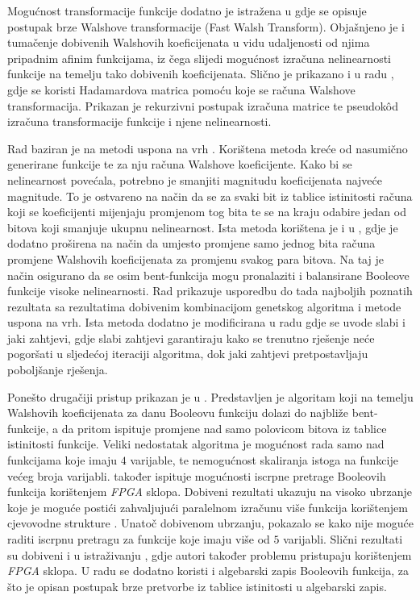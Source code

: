 \documentclass[times, utf8, diplomski, numeric]{fer}
\begin{document}
Mogućnost transformacije funkcije dodatno je istražena u \cite{MeasuringBoolean} gdje se opisuje postupak brze Walshove transformacije \engl(Fast Walsh Transform).
Objašnjeno je i tumačenje dobivenih Walshovih koeficijenata u vidu udaljenosti od njima pripadnim afinim funkcijama, iz čega slijedi mogućnost izračuna nelinearnosti funkcije na temelju tako dobivenih koeficijenata.
Slično je prikazano i u radu \cite{CalculatingNonlinearity}, gdje se koristi Hadamardova matrica pomoću koje se računa Walshove transformacija.
Prikazan je rekurzivni postupak izračuna matrice te pseudok\^{o}d izračuna transformacije funkcije i njene nelinearnosti.

Rad \cite{millan1997smart} baziran je na metodi uspona na vrh .
Korištena metoda kreće od nasumično generirane funkcije te za nju računa Walshove koeficijente.
Kako bi se nelinearnost povećala, potrebno je smanjiti magnitudu koeficijenata najveće magnitude.
To je ostvareno na način da se za svaki bit iz tablice istinitosti računa koji se koeficijenti mijenjaju promjenom tog bita te se na kraju odabire jedan od bitova koji smanjuje ukupnu nelinearnost.
Ista metoda korištena je i u \cite{millan1997effective}, gdje je dodatno proširena na način da umjesto promjene samo jednog bita računa promjene Walshovih koeficijenata za promjenu svakog para bitova.
Na taj je način osigurano da se osim bent-funkcija mogu pronalaziti i balansirane Booleove funkcije visoke nelinearnosti.
Rad \cite{millan1998heuristic} prikazuje usporedbu do tada najboljih poznatih rezultata sa rezultatima dobivenim kombinacijom genetskog algoritma i metode uspona na vrh.
Ista metoda dodatno je modificirana u radu \cite{millan1999boolean} gdje se uvode slabi  i jaki  zahtjevi, gdje slabi zahtjevi garantiraju kako se trenutno rješenje neće pogoršati u sljedećoj iteraciji algoritma, dok jaki zahtjevi pretpostavljaju poboljšanje rješenja.

Ponešto drugačiji pristup prikazan je u \cite{DiscoveryOfBent}.
Predstavljen je algoritam koji na temelju Walshovih koeficijenata za danu Booleovu funkciju dolazi do najbliže bent-funkcije, a da pritom ispituje promjene nad samo polovicom bitova iz tablice istinitosti funkcije.
Veliki nedostatak algoritma je mogućnost rada samo nad funkcijama koje imaju $4$ varijable, te nemogućnost skaliranja istoga na funkcije većeg broja varijabli.
\cite{DiscoveryOfBent} također ispituje mogućnosti iscrpne pretrage Booleovih funkcija korištenjem \textit{FPGA} sklopa.
Dobiveni rezultati ukazuju na visoko ubrzanje koje je moguće postići zahvaljujući paralelnom izračunu više funkcija korištenjem cjevovodne strukture .
Unatoč dobivenom ubrzanju, pokazalo se kako nije moguće raditi iscrpnu pretragu za funkcije koje imaju više od $5$ varijabli.
Slični rezultati su dobiveni i u istraživanju \cite{EnumerationOfBentBoolean}, gdje autori također problemu pristupaju korištenjem \textit{FPGA} sklopa.
U radu se dodatno koristi i algebarski zapis Booleovih funkcija, za što je opisan postupak brze pretvorbe iz tablice istinitosti u algebarski zapis.
\end{document}
